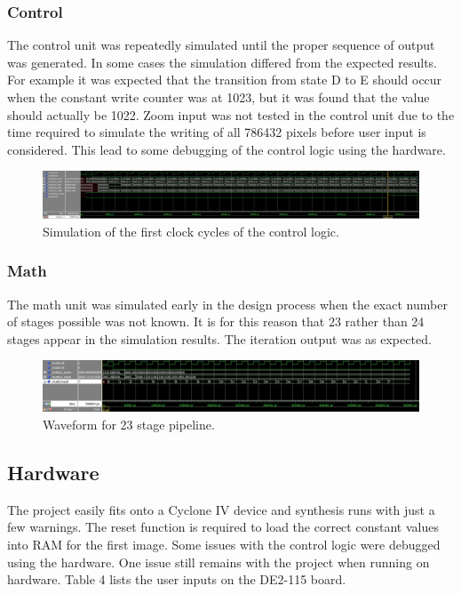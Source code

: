 \documentclass[titlepage]{article}      %
\begin{document}
\subsubsection{Control}
The control unit was repeatedly simulated until the proper sequence of output was generated. In some cases the simulation differed from the expected results. For example it was expected that the transition from state D to E should occur when the constant write counter was at 1023, but it was found that the value should actually be 1022. Zoom input was not tested in the control unit due to the time required to simulate the writing of all 786432 pixels before user input is considered. This lead to some debugging of the control logic using the hardware.
\begin{figure}[H]
\centering
\includegraphics[width=6in]{Control}
\caption{Simulation of the first clock cycles of the control logic.}
\end{figure}
\subsubsection{Math}
The math unit was simulated early in the design process when the exact number of stages possible was not known. It is for this reason that 23 rather than 24 stages appear in the simulation results. The iteration output was as expected.
\begin{figure}[H]
\centering
\includegraphics[width=6in]{Math}
\caption{Waveform for 23 stage pipeline.}
\end{figure}
\subsection{Hardware}
The project easily fits onto a Cyclone IV device and synthesis runs with just a few warnings. The reset function is required to load the correct constant values into RAM for the first image. Some issues with the control logic were debugged using the hardware. One issue still remains with the project when running on hardware. Table 4 lists the user inputs on the DE2-115 board.
\begin{table}[H]
\centering
{}
\caption{User inputs.}
\end{table}
\end{document}
